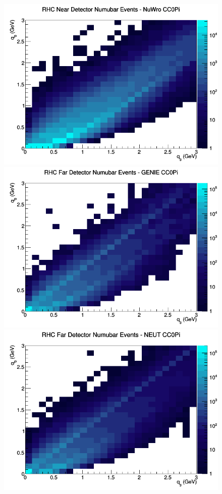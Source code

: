 \documentclass[12pt]{article}
\begin{document}
\begin{figure}[h]
\includegraphics[width=\linewidth]{eff_q0_q3/GAr/CC0Pi_RHC_ND_numubar_q3_q0_NuWro.png}
\endminipage
\newline
{}
\includegraphics[width=\linewidth]{eff_q0_q3/GAr/CC0Pi_RHC_FD_numubar_q3_q0_GENIE.png}
\endminipage
{}
\includegraphics[width=\linewidth]{eff_q0_q3/GAr/CC0Pi_RHC_FD_numubar_q3_q0_NEUT.png}

\end{figure}
\end{document}
